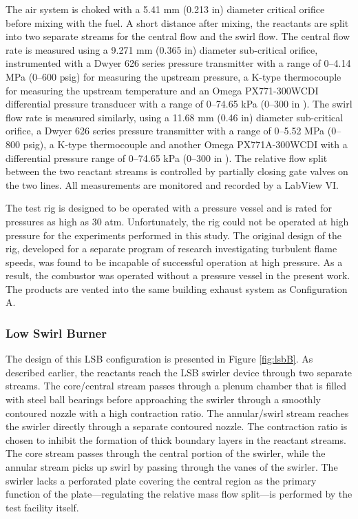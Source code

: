 The air system is choked with a 5.41 mm (0.213 in) diameter critical orifice before mixing with the fuel.
A short distance after mixing, the reactants are split into two separate streams for the central flow and the swirl flow.
The central flow rate is measured using a 9.271 mm (0.365 in) diameter sub-critical orifice, instrumented with a Dwyer 626 series pressure transmitter with a range of 0--4.14 MPa (0--600 psig) for measuring the upstream pressure, a K-type thermocouple for measuring the upstream temperature and an Omega PX771-300WCDI differential pressure transducer with a range of 0--74.65 kPa (0--300 in ).
The swirl flow rate is measured similarly, using a 11.68 mm (0.46 in) diameter sub-critical orifice, a Dwyer 626 series pressure transmitter with a range of 0--5.52 MPa (0--800 psig), a K-type thermocouple and another Omega PX771A-300WCDI with a differential pressure range of 0--74.65 kPa (0--300 in ).
The relative flow split between the two reactant streams is controlled by partially closing gate valves on the two lines.
All measurements are monitored and recorded by a LabView VI.

The test rig is designed to be operated with a pressure vessel and is rated for pressures as high as 30 atm.
Unfortunately, the rig could not be operated at high pressure for the experiments performed in this study.
The original design of the rig, developed for a separate program of research investigating turbulent flame speeds, was found to be incapable of successful operation at high pressure.
As a result, the combustor was operated without a pressure vessel in the present work.
The products are vented into the same building exhaust system as Configuration A.

\subsubsection{Low Swirl Burner}
\label{subsubsec:configuration-b-low-swirl-burner}



The design of this LSB configuration is presented in Figure \ref{fig:lsbB}.
As described earlier, the reactants reach the LSB swirler device through two separate streams.
The core/central stream passes through a plenum chamber that is filled with steel ball bearings before approaching the swirler through a smoothly contoured nozzle with a high contraction ratio.
The annular/swirl stream reaches the swirler directly through a separate contoured nozzle.
The contraction ratio is chosen to inhibit the formation of thick boundary layers in the reactant streams.
The core stream passes through the central portion of the swirler, while the annular stream picks up swirl by passing through the vanes of the swirler.
The swirler lacks a perforated plate covering the central region as the primary function of the plate---regulating the relative mass flow split---is performed by the test facility itself.

